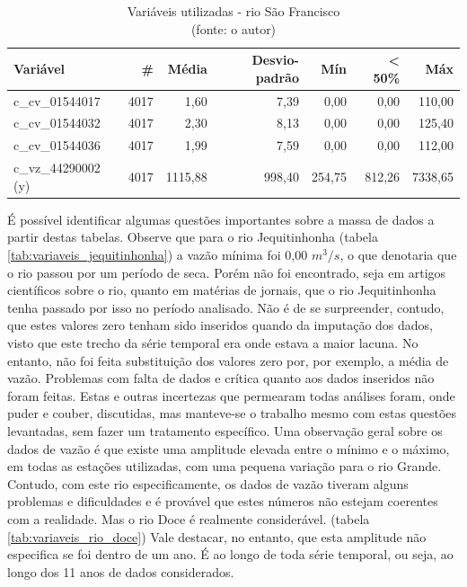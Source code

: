 \begin{table}[!h]
	\centering \small
	\caption{Variáveis utilizadas - rio São Francisco \\(fonte: o autor)}
	\begin{tabular}{|l|r|r|r|r|r|r|} \hline 
		\textbf{Variável}   & \textbf{\#} & \textbf{Média} & \textbf{Desvio-padrão} & \textbf{Mín} & \textbf{< 50\%} & \textbf{Máx} \\\hline
		c\_cv\_01544017     & 4017        & 1,60           & 7,39                   & 0,00         & 0,00            & 110,00       \\\hline
		c\_cv\_01544032     & 4017        & 2,30           & 8,13                   & 0,00         & 0,00            & 125,40       \\\hline
		c\_cv\_01544036     & 4017        & 1,99           & 7,59                   & 0,00         & 0,00            & 112,00       \\\hline
		c\_vz\_44290002 (y) & 4017        & 1115,88        & 998,40                 & 254,75       & 812,26          & 7338,65      \\\hline
	\end{tabular}
	\label{tab:variaveis_rio_sao_francisco}
\end{table}
\clearpage

É possível identificar algumas questões importantes sobre a massa de dados a partir destas tabelas. Observe que para o rio Jequitinhonha (tabela \ref{tab:variaveis_jequitinhonha}) a vazão mínima foi 0,00 $m^3/s$, o que denotaria que o rio passou por um período de seca. Porém não foi encontrado, seja em artigos científicos sobre o rio, quanto em matérias de jornais, que o rio Jequitinhonha tenha passado por isso no período analisado. Não é de se surpreender, contudo, que estes valores zero tenham sido inseridos quando da imputação dos dados, visto que este trecho da série temporal era onde estava a maior lacuna. No entanto, não foi feita substituição dos valores zero por, por exemplo, a média de vazão. Problemas com falta de dados e crítica quanto aos dados inseridos não foram feitas. Estas e outras incertezas que permearam todas análises foram, onde puder e couber, discutidas, mas manteve-se o trabalho mesmo com estas questões levantadas, sem fazer um tratamento específico. Uma observação geral sobre os dados de vazão é que existe uma amplitude elevada entre o mínimo e o máximo, em todas as estações utilizadas, com uma pequena variação para o rio Grande. Contudo, com este rio especificamente, os dados de vazão tiveram alguns problemas e dificuldades e é provável que estes números não estejam coerentes com a realidade. Mas o rio Doce é realmente considerável. (tabela \ref{tab:variaveis_rio_doce}) Vale destacar, no entanto, que esta amplitude não especifica se foi dentro de um ano. É ao longo de toda série temporal, ou seja, ao longo dos 11 anos de dados considerados.

